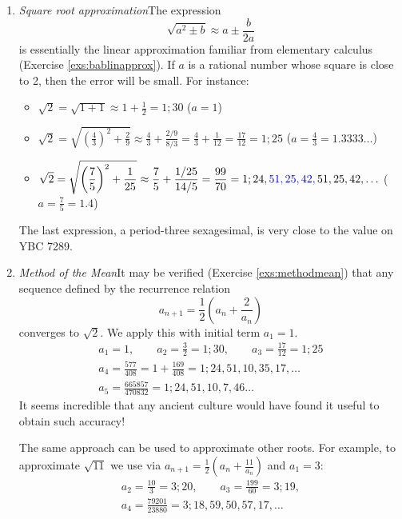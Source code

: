 \begin{enumerate}
	\item\label{babroot} \emph{Square root approximation}\lstsp The expression
	\[
		\sqrt{a^2\pm b}\approx a\pm\frac b{2a}\] is essentially the linear approximation familiar from elementary calculus (Exercise \ref{exs:bablinapprox}). If $a$ is a rational number whose square is close to 2, then the error will be small. For instance:
	\begin{itemize}
  	\item $\displaystyle\sqrt 2=\sqrt{1+1}\approx 1+\frac 12=1;30$ \hfill($a=1$)
  	\item $\displaystyle\sqrt 2=\sqrt{\left(\frac 43\right)^2+\frac 29}\approx\frac 43+\frac{2/9}{8/3}=\frac 43+\frac 1{12}=\frac{17}{12}=1;25$ \hfill($a=\frac 43=1.3333\ldots$)
  	\item $\displaystyle\sqrt 2=\sqrt{\left(\frac 75\right)^2+\frac 1{25}}\approx \frac 75+\frac{1/25}{14/5}=\frac{99}{70}=1;24,\textcolor{blue}{51,25,42,}\,51,25,42,\ldots$ \hfill($a=\frac 75=1.4$)
	\end{itemize}
	The last expression, a period-three sexagesimal, is very close to the value on YBC 7289.
	
	\item\label{methodmean} \emph{Method of the Mean}\lstsp It may be verified (Exercise \ref{exs:methodmean}) that any sequence defined by the recurrence relation
	\[
		a_{n+1}=\frac 12\left(a_n+\frac 2{a_n}\right)
	\]
	converges to $\sqrt 2$. We apply this with initial term $a_1=1$.
	\begin{gather*}
		a_1=1,\qquad a_2=\frac 32=1;30,\qquad a_3=\frac{17}{12}=1;25\\[6pt]
		a_4=\frac{577}{408}=1+\frac{169}{408}=1;24,51,10,35,17,\ldots\\[6pt]
		a_5=\frac{665857}{470832}=1;24,51,10,7,46\ldots
	\end{gather*}
	It seems incredible that any ancient culture would have found it useful to obtain such accuracy!\smallbreak

	The same approach can be used to approximate other roots. For example, to approximate $\sqrt{11}$ we use via $a_{n+1}=\frac 12(a_n+\frac{11}{a_n})$ and $a_1=3$:
	\begin{gather*}
		a_2=\frac{10}3=3;20,\qquad a_3=\frac{199}{60}=3;19,\\
		a_4=\frac{79201}{23880}=3;18,59,50,57,17,\ldots
	\end{gather*}
\end{enumerate}

